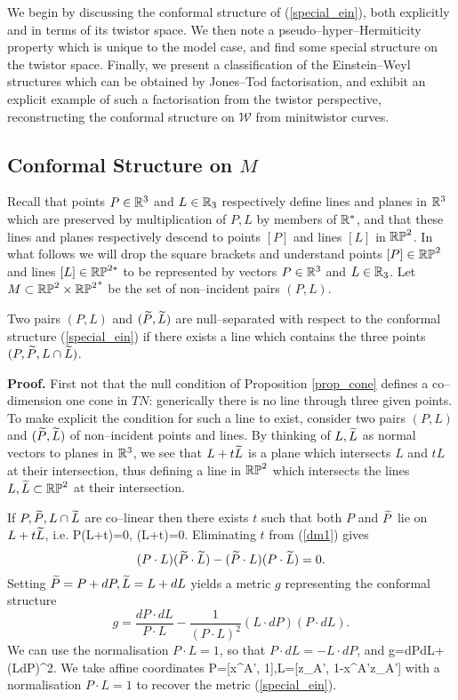 We begin by discussing the  conformal structure
of (\ref{special_ein}), both explicitly and in terms of its twistor space. We then note a pseudo--hyper--Hermiticity property which is unique to the model case, and find some special structure on the twistor space. Finally, we present a classification of the Einstein--Weyl structures which can be obtained by Jones--Tod factorisation, and exhibit an explicit example of such a factorisation from the twistor perspective, reconstructing the conformal structure on $\mathcal{W}$ from minitwistor curves.
\subsection{Conformal Structure on $M$}
\label{model_conf}
Recall that points $P\in\mathbb{R}^3$ and $L\in\mathbb{R}_3$ respectively define lines and planes in $\mathbb{R}^3$ which are preserved by multiplication of $P,L$ by members of $\mathbb{R}^*$, and that these lines and planes respectively descend to points $[P]$ and lines $[L]$ in $\mathbb{RP}^2$. In what follows we will drop the square brackets and understand points $[P]\in\mathbb{RP}^2$ and lines $[L]\in\mathbb{RP}^{2*}$ to be represented by vectors $P\in\mathbb{R}^3$ and $L\in\mathbb{R}_3$. Let $M\subset \mathbb{RP}^2\times {\mathbb{RP}^2}^*$ be the set of non--incident pairs 
$(P, L)$.
\begin{prop}
\label{prop_cone}
Two pairs $(P, L)$ and $(\widetilde{P}, \widetilde{L})$ are null--separated
with respect to the conformal structure (\ref{special_ein})
if there exists
a line which contains the three points $(P, \widetilde{P}, L\cap \widetilde{L})$. 
\end{prop}
{\bf Proof.}
First not that the  null condition of Proposition \ref{prop_cone}
defines a co--dimension one cone in $TN$: 
generically there is no line through three given points. To make explicit the condition for such a line to exist, consider two pairs  $(P, L)$ and $(\widetilde{P}, \widetilde{L})$ 
of non--incident points and lines. By thinking of $L,\widetilde{L}$ as normal vectors to planes in $\mathbb{R}^3$, we see that $L+t\widetilde{L}$ is a plane which intersects $L$ and $tL$ at their intersection, thus defining a line in $\mathbb{RP}^2$ which intersects the lines $L,\widetilde{L}\subset\mathbb{RP}^2$ at their intersection.

If $P,\widetilde{P},L\cap\widetilde{L}$ are co--linear then there exists $t$ such that both $P$ and $\widetilde{P}$ lie on $L+t\widetilde{L}$, i.e.
\be
\label{dm1}
P\cdot (L+t\tL)=0,  \quad
\tP\cdot (L+t\tL)=0.
\ee 
Eliminating $t$ from 
(\ref{dm1}) gives
\[
(P\cdot L)(\widetilde{P}\cdot \widetilde{L})-(\widetilde{P}\cdot L)(P\cdot \widetilde{L})=0.
\]
Setting $\widetilde{P}=P+dP, \widetilde{L}=L+dL$ yields a metric 
$g$  representing the conformal structure
\[
g=\frac{dP\cdot dL}{P\cdot L}-\frac{1}{(P\cdot L)^2}(L\cdot dP)(P\cdot dL).
\]
We can use the normalisation $P\cdot L=1$, so that $P\cdot dL=-L\cdot dP$,
and
\be
\label{dm_metric}
g={dP\cdot dL}+(L\cdot dP)^2.
\ee
We take affine coordinates 
\be
\label{DM_parameter}
P=[x^{A'}, 1],\quad L=[z_{A'}, 1-x^{A'}z_{A'}]
\ee 
with a normalisation $P\cdot L=1$ to recover the metric (\ref{special_ein}).
\koniec
